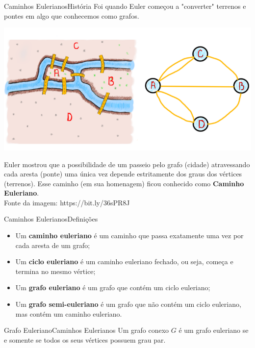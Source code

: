\documentclass[t]{beamer}
\begin{document}

\begin{ftst}{Caminhos Eulerianos}{História}
\footnotesize
Foi quando Euler começou a "converter" terrenos e pontes em algo que conhecemos como grafos.

\centering
\includegraphics[scale=0.3]{Figuras/euleriano_5.png}

\justifying
\footnotesize
Euler mostrou que a possibilidade de um passeio pelo grafo (cidade) atravessando cada aresta (ponte) uma única vez depende estritamente dos graus dos vértices (terrenos). Esse caminho (em sua homenagem) ficou conhecido como \textbf{Caminho Euleriano}. \\
\vone
\tiny
Fonte da imagem: \hypertarget{clique aqui.}{https://bit.ly/36sPR8J}
\end{ftst}


\begin{ftst}{Caminhos Eulerianos}{Definições}

\begin{itemize}
    \item Um \textbf{caminho euleriano} é um caminho que passa exatamente uma vez por cada aresta de um grafo;
    \item Um \textbf{ciclo euleriano} é um caminho euleriano fechado, ou seja, começa e termina no mesmo vértice;
    \item Um \textbf{grafo euleriano} é um grafo que contém um ciclo euleriano;
    \item Um \textbf{grafo semi-euleriano} é um grafo que não contém um ciclo euleriano, mas contém um caminho euleriano.
\end{itemize}

\end{ftst}


\begin{ftst}{Grafo Euleriano}{Caminhos Eulerianos}
\vone
Um grafo conexo $G$ é um grafo euleriano se e somente se todos os seus vértices possuem grau par.
\vone
\centering


\end{ftst}
\end{document}

